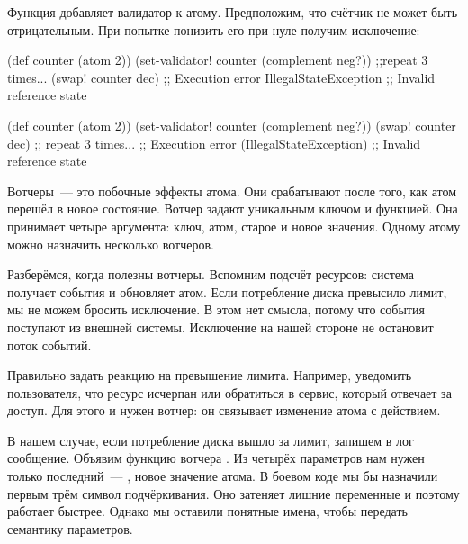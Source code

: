 
Функция  добавляет валидатор к атому. Предположим, что
счётчик не может быть отрицательным. При попытке понизить его при нуле получим
исключение:

\ifnarrow

\begin{clojure}
(def counter (atom 2))
(set-validator!
  counter (complement neg?))
;;repeat 3 times...
(swap! counter dec)
;; Execution error IllegalStateException
;; Invalid reference state
\end{clojure}

\else

\begin{clojure}
(def counter (atom 2))
(set-validator! counter (complement neg?))
(swap! counter dec) ;; repeat 3 times...
;; Execution error (IllegalStateException)
;; Invalid reference state
\end{clojure}

\fi

Вотчеры~--- это побочные эффекты атома. Они срабатывают после того, как атом
перешёл в новое состояние. Вотчер задают уникальным ключом и функцией. Она
принимает четыре аргумента: ключ, атом, старое и новое значения. Одному атому
можно назначить несколько вотчеров.

Разберёмся, когда полезны вотчеры. Вспомним подсчёт ресурсов: система получает
события и обновляет атом. Если потребление диска превысило лимит, мы не можем
бросить исключение. В этом нет смысла, потому что события поступают из внешней
системы. Исключение на нашей стороне не остановит поток событий.


Правильно задать реакцию на превышение лимита. Например, уведомить пользователя,
что ресурс исчерпан или обратиться в сервис, который отвечает за доступ. Для
этого и нужен вотчер: он связывает изменение атома с действием.


В нашем случае, если потребление диска вышло за лимит, запишем в лог
сообщение. Объявим функцию вотчера . Из четырёх параметров
нам нужен только последний~--- , новое значение атома. В боевом коде
мы бы назначили первым трём символ подчёркивания. Оно затеняет лишние переменные
и поэтому работает быстрее. Однако мы оставили понятные имена, чтобы передать
семантику параметров.


